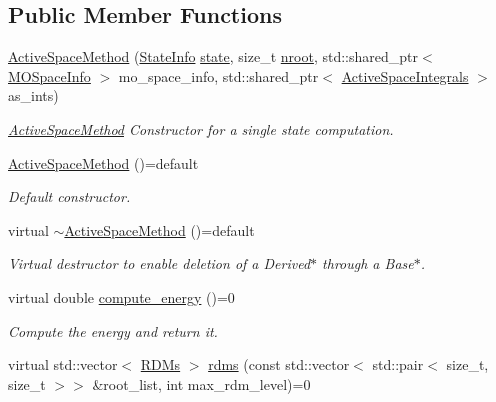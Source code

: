 \subsection*{Public Member Functions}
\begin{DoxyCompactItemize}
\item 
\mbox{\hyperlink{classforte_1_1_active_space_method_afa70f2a1ba6e629d47aa9cd53aaff803}{Active\+Space\+Method}} (\mbox{\hyperlink{classforte_1_1_state_info}{State\+Info}} \mbox{\hyperlink{classforte_1_1_active_space_method_a609f005cc7d3a1bc03ae517002eb19dc}{state}}, size\+\_\+t \mbox{\hyperlink{classforte_1_1_active_space_method_aa2bafc732bd7023fd32fbd263ef2e903}{nroot}}, std\+::shared\+\_\+ptr$<$ \mbox{\hyperlink{classforte_1_1_m_o_space_info}{M\+O\+Space\+Info}} $>$ mo\+\_\+space\+\_\+info, std\+::shared\+\_\+ptr$<$ \mbox{\hyperlink{classforte_1_1_active_space_integrals}{Active\+Space\+Integrals}} $>$ as\+\_\+ints)
\begin{DoxyCompactList}\small\item\em \mbox{\hyperlink{classforte_1_1_active_space_method}{Active\+Space\+Method}} Constructor for a single state computation. \end{DoxyCompactList}\item 
\mbox{\hyperlink{classforte_1_1_active_space_method_ae630700e0a16cca4aaa0e22d0902f873}{Active\+Space\+Method}} ()=default
\begin{DoxyCompactList}\small\item\em Default constructor. \end{DoxyCompactList}\item 
virtual \mbox{\hyperlink{classforte_1_1_active_space_method_a89c56600b54016ec3ad0c4c946fe0e5d}{$\sim$\+Active\+Space\+Method}} ()=default
\begin{DoxyCompactList}\small\item\em Virtual destructor to enable deletion of a Derived$\ast$ through a Base$\ast$. \end{DoxyCompactList}\item 
virtual double \mbox{\hyperlink{classforte_1_1_active_space_method_a99736e2b94405371b224b0750569b077}{compute\+\_\+energy}} ()=0
\begin{DoxyCompactList}\small\item\em Compute the energy and return it. \end{DoxyCompactList}\item 
virtual std\+::vector$<$ \mbox{\hyperlink{classforte_1_1_r_d_ms}{R\+D\+Ms}} $>$ \mbox{\hyperlink{classforte_1_1_active_space_method_a0b2c4903551a7602db815d67349ba7c9}{rdms}} (const std\+::vector$<$ std\+::pair$<$ size\+\_\+t, size\+\_\+t $>$$>$ \&root\+\_\+list, int max\+\_\+rdm\+\_\+level)=0
$$
\end{DoxyCompactItemize}
